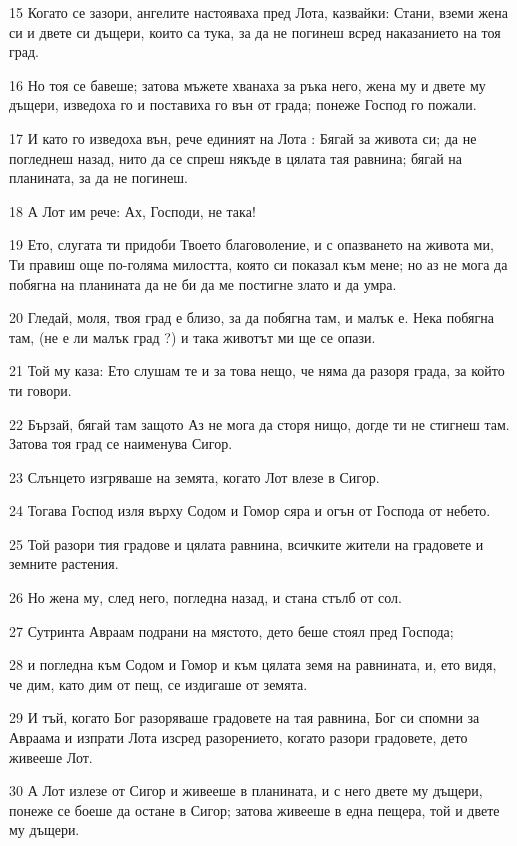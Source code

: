\par 15 Когато се зазори, ангелите настояваха пред Лота, казвайки: Стани, вземи жена си и двете си дъщери, които са тука, за да не погинеш всред наказанието на тоя град.
\par 16 Но тоя се бавеше; затова мъжете хванаха за ръка него, жена му и двете му дъщери, изведоха го и поставиха го вън от града; понеже Господ го пожали.
\par 17 И като го изведоха вън, рече единият на Лота : Бягай за живота си; да не погледнеш назад, нито да се спреш някъде в цялата тая равнина; бягай на планината, за да не погинеш.
\par 18 А Лот им рече: Ах, Господи, не така!
\par 19 Ето, слугата ти придоби Твоето благоволение, и с опазването на живота ми, Ти правиш още по-голяма милостта, която си показал към мене; но аз не мога да побягна на планината да не би да ме постигне злато и да умра.
\par 20 Гледай, моля, твоя град е близо, за да побягна там, и малък е. Нека побягна там, (не е ли малък град ?) и така животът ми ще се опази.
\par 21 Той му каза: Ето слушам те и за това нещо, че няма да разоря града, за който ти говори.
\par 22 Бързай, бягай там защото Аз не мога да сторя нищо, догде ти не стигнеш там. Затова тоя град се наименува Сигор.
\par 23 Слънцето изгряваше на земята, когато Лот влезе в Сигор.
\par 24 Тогава Господ изля върху Содом и Гомор сяра и огън от Господа от небето.
\par 25 Той разори тия градове и цялата равнина, всичките жители на градовете и земните растения.
\par 26 Но жена му, след него, погледна назад, и стана стълб от сол.
\par 27 Сутринта Авраам подрани на мястото, дето беше стоял пред Господа;
\par 28 и погледна към Содом и Гомор и към цялата земя на равнината, и, ето видя, че дим, като дим от пещ, се издигаше от земята.
\par 29 И тъй, когато Бог разоряваше градовете на тая равнина, Бог си спомни за Авраама и изпрати Лота изсред разорението, когато разори градовете, дето живееше Лот.
\par 30 А Лот излезе от Сигор и живееше в планината, и с него двете му дъщери, понеже се боеше да остане в Сигор; затова живееше в една пещера, той и двете му дъщери.
